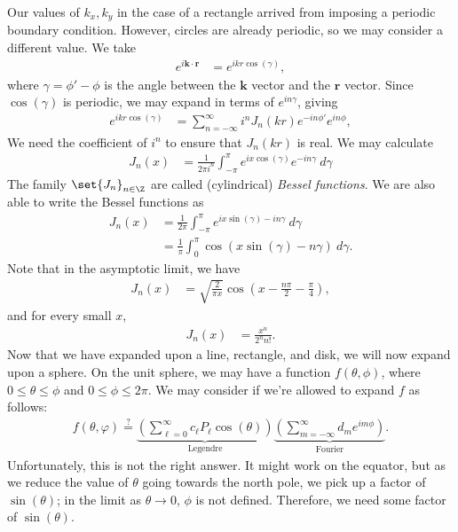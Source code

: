 \documentclass[10pt]{mypackage}
\begin{document}
  Our values of $k_x,k_y$ in the case of a rectangle arrived from imposing a periodic boundary condition. However, circles are already periodic, so we may consider a different value. We take
  \begin{align*}
    e^{i\mathbf{k}\cdot \mathbf{r}} &= e^{ikr \cos\left( \gamma \right)}, 
  \end{align*}
  where $\gamma = \phi'-\phi$ is the angle between the $\mathbf{k}$ vector and the $\mathbf{r}$ vector. Since $\cos\left( \gamma \right)$ is periodic, we may expand in terms of $e^{in\gamma}$, giving
  \begin{align*}
    e^{ikr\cos\left( \gamma \right)} &= \sum_{n=-\infty}^{\infty} i^{n} J_n\left( kr \right) e^{-in\phi'}e^{in\phi},
  \end{align*}
  We need the coefficient of $i^{n}$ to ensure that $J_n\left( kr \right)$ is real. We may calculate
  \begin{align*}
    J_n\left( x \right) &= \frac{1}{2\pi i^{n}}\int_{-\pi}^{\pi} e^{ix\cos\left( \gamma \right)}e^{-in\gamma}\:d\gamma
  \end{align*}
  The family $\set{J_n}_{n\in \Z}$ are called (cylindrical) \textit{Bessel functions}. We are also able to write the Bessel functions as
  \begin{align*}
    J_n\left( x \right) &= \frac{1}{2\pi} \int_{-\pi}^{\pi} e^{ix\sin\left( \gamma \right)-in\gamma}\:d\gamma\\
                        &= \frac{1}{\pi} \int_{0}^{\pi} \cos\left( x\sin\left( \gamma \right)-n\gamma \right)\:d\gamma.
  \end{align*}
  Note that in the asymptotic limit, we have
  \begin{align*}
    J_n\left( x \right) &= \sqrt{\frac{2}{\pi x}} \cos\left( x-\frac{n\pi}{2}-\frac{\pi}{4} \right),
  \end{align*}
  and for every small $x$,
  \begin{align*}
    J_n\left( x \right) &= \frac{x^n}{2^n n!}.
  \end{align*}
  Now that we have expanded upon a line, rectangle, and disk, we will now expand upon a sphere. On the unit sphere, we may have a function $f\left( \theta,\phi \right)$, where $0 \leq \theta \leq \phi$ and $0 \leq \phi \leq 2\pi$. We may consider if we're allowed to expand $f$ as follows:
  \begin{align*}
    f\left( \theta,\varphi \right) \stackrel{?}{=} \underbrace{\left( \sum_{\ell = 0}^{\infty}c_{\ell}P_{\ell}\cos\left( \theta \right) \right)}_{\text{Legendre}}\underbrace{\left( \sum_{m=-\infty}^{\infty}d_me^{im\phi} \right)}_{\text{Fourier}}.\label{eq:fake_spherical_harmonics}\tag{\textasteriskcentered}
  \end{align*}
  Unfortunately, this is not the right answer. It might work on the equator, but as we reduce the value of $\theta$ going towards the north pole, we pick up a factor of $\sin\left( \theta \right)$; in the limit as $\theta\rightarrow 0$, $\phi$ is not defined. Therefore, we need some factor of $\sin\left( \theta \right)$.\newline
\end{document}
